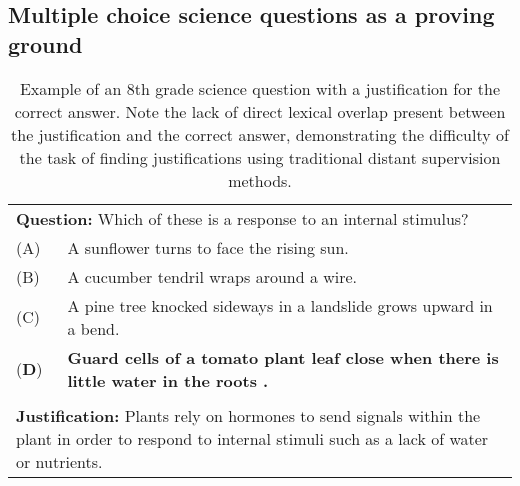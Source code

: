 \subsection{Multiple choice science questions as a proving ground}
\label{sec:mcqa}

\begin{table}[t]
\begin{center}
\begin{tabularx}{\linewidth}{p{1cm}p{13cm}}
\multicolumn{2}{p{15cm}}{\textbf{Question:} Which of these is a response to an internal stimulus?} \\
 (A) & A sunflower turns to face the rising sun. \\
 (B) & A cucumber tendril wraps around a wire. \\
 (C) &  A pine tree knocked sideways in a landslide grows upward in a bend. \\
 (\textbf{D}) &\textbf{Guard cells of a tomato plant leaf close when there is little water in the roots .} \\
\\
\multicolumn{2}{p{15cm}}{\textbf{Justification:} 
Plants rely on hormones to send signals within the plant in order to respond to internal stimuli such as a lack of water or nutrients. } \\
\end{tabularx}

\caption{{  Example of an 8th grade science question with a justification for the correct answer.  Note the lack of direct lexical overlap present between the justification and the correct answer, demonstrating the difficulty of the task of finding justifications using traditional distant supervision methods. }}

\label{tab:question_example}
\end{center}
\end{table}

